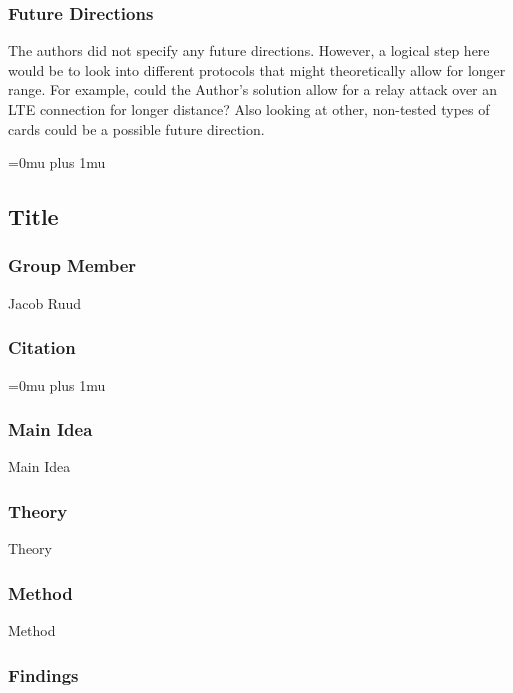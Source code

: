 \subsubsection{Future Directions}

\noindent
The authors did not specify any future directions.  However, a logical step here would be to look into different protocols that might theoretically allow for longer range.  For example, could the Author's solution allow for a relay attack over an LTE connection for longer distance?  Also looking at other, non-tested types of cards could be a possible future direction.

\Urlmuskip=0mu plus 1mu\relax

\noindent
\subsection{Title}

\subsubsection{Group Member}

\noindent
Jacob Ruud

\noindent
\subsubsection{Citation}

\Urlmuskip=0mu plus 1mu\relax

\subsubsection{Main Idea}

\noindent
Main Idea

\subsubsection{Theory}

\noindent
Theory

\subsubsection{Method}

\noindent
Method

\subsubsection{Findings}

